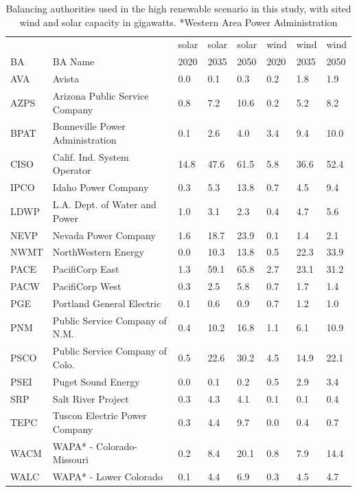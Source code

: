 \documentclass{agujournal2019}
\begin{document}
\begin{table} 
\begin{tabular}{llllllll}
     &                                        & solar & solar & solar & wind & wind & wind \\
BA   & BA Name                                & 2020  & 2035  & 2050  & 2020 & 2035 & 2050 \\\hline
AVA  & Avista                                 &   0.0 & 0.1 & 0.3 & 0.2 & 1.8 & 1.9  \\
AZPS & Arizona Public Service Company         &   0.8 & 7.2 & 10.6 & 0.2 & 5.2 & 8.2  \\
BPAT & Bonneville Power Administration        &   0.1 & 2.6 & 4.0 & 3.4 & 9.4 & 10.0  \\
CISO & Calif. Ind. System Operator            &   14.8 & 47.6 & 61.5 & 5.8 & 36.6 & 52.4  \\
IPCO & Idaho Power Company                    &   0.3 & 5.3 & 13.8 & 0.7 & 4.5 & 9.4  \\
LDWP & L.A. Dept. of Water and Power          &   1.0 & 3.1 & 2.3 & 0.4 & 4.7 & 5.6  \\
NEVP & Nevada Power Company                   &   1.6 & 18.7 & 23.9 & 0.1 & 1.4 & 2.1  \\
NWMT & NorthWestern Energy                    &   0.0 & 10.3 & 13.8 & 0.5 & 22.3 & 33.9  \\
PACE & PacifiCorp East                        &   1.3 & 59.1 & 65.8 & 2.7 & 23.1 & 31.2  \\
PACW & PacifiCorp West                        &   0.3 & 2.5 & 5.8 & 0.7 & 1.7 & 1.4  \\
PGE  & Portland General Electric              &   0.1 & 0.6 & 0.9 & 0.7 & 1.2 & 1.0  \\
PNM  & Public Service Company of N.M.         &   0.4 & 10.2 & 16.8 & 1.1 & 6.1 & 10.9  \\
PSCO & Public Service Company of Colo.        &   0.5 & 22.6 & 30.2 & 4.5 & 14.9 & 22.1  \\
PSEI & Puget Sound Energy                     &   0.0 & 0.1 & 0.2 & 0.5 & 2.9 & 3.4  \\
SRP  & Salt River Project                     &   0.3 & 4.3 & 4.1 & 0.1 & 0.1 & 0.4  \\
TEPC & Tuscon Electric Power Company          &   0.3 & 4.4 & 9.7 & 0.0 & 0.4 & 0.7  \\
WACM & WAPA* - Colorado-Missouri               &  0.2 & 8.4 & 20.1 & 0.8 & 7.9 & 14.4   \\
WALC & WAPA* - Lower Colorado                  &  0.1 & 4.4 & 6.9 & 0.3 & 4.5 & 4.7  \\
\hline
\end{tabular}
\caption{Balancing authorities used in the high renewable scenario in this study, with sited wind and solar capacity in gigawatts. *Western Area Power Administration}
\label{tab:bas}
\end{table}
\end{document}
